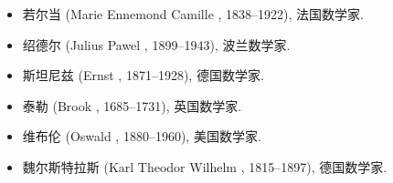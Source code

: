 \begin{itemize}
  \item 若尔当 (Marie Ennemond Camille , 1838--1922), 法国数学家.
  \item 绍德尔 (Julius Pawel , 1899--1943), 波兰数学家.
  \item 斯坦尼兹 (Ernst , 1871--1928), 德国数学家.
  \item 泰勒 (Brook , 1685--1731), 英国数学家.
  \item 维布伦 (Oswald , 1880--1960), 美国数学家.
  \item 魏尔斯特拉斯 (Karl Theodor Wilhelm , 1815--1897), 德国数学家.
\end{itemize}

